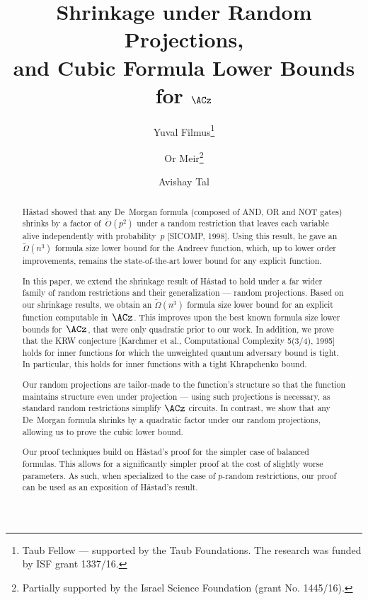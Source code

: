 \documentclass{toc}
\begin{document}
\begin{frontmatter}[classification=text]

%
%
%

\title{Shrinkage under Random Projections, \\
  and Cubic Formula Lower Bounds\\ for $\ACz$ }

\author[filmus]{Yuval Filmus\thanks{Taub Fellow --- supported by
			the Taub Foundations. The research was funded by ISF grant 1337/16.}}
\author[meir]{Or Meir\thanks{Partially supported by the Israel Science Foundation (grant No. 1445/16).}}
\author[tal]{Avishay Tal}

\begin{abstract}
H{\aa}stad showed that any De~Morgan formula (composed of AND, OR
and NOT gates) shrinks by a factor of~$\tilde{O}(p^{2})$ under a random
restriction that leaves each variable alive independently with probability~$p$
{[}SICOMP, 1998{]}. Using this result, he gave an $\widetilde{\Omega}(n^{3})$
formula size lower bound for the Andreev function, which, up to lower
order improvements, remains the state-of-the-art lower bound for any
explicit function.

In this %
paper,  %
we extend the shrinkage result of H{\aa}stad to hold
under a far wider family of random restrictions and their generalization
--- random projections. Based on our shrinkage results, we obtain
an $\widetilde{\Omega}(n^{3})$ formula size lower bound for an explicit
function computable in~$\ACz$. This improves upon the best known
formula size lower bounds for~$\ACz$, that were only quadratic prior
to our work. In addition, we prove that the KRW conjecture {[}Karchmer
et al., Computational Complexity 5(3/4), 1995{]} holds for inner functions
for which the unweighted quantum adversary bound is tight. In particular,
this holds for inner functions with a tight Khrapchenko bound.

Our random projections are tailor-made to the function's structure
so that the function maintains structure even under projection ---
using such projections is necessary, as standard random restrictions
simplify $\ACz$ circuits. In contrast, we show that any De~Morgan
formula shrinks by a quadratic factor under our random projections,
allowing us to prove the cubic lower bound.

Our proof techniques build on %
H{\aa}stad's proof   %
for the simpler
case of balanced formulas. This allows for a significantly simpler
proof at the cost of slightly worse parameters. As such, when specialized
to the case of $p$-random restrictions, our proof can be used as
an exposition of H{\aa}stad's result. 
\end{abstract}

%

\end{frontmatter}
\end{document}
